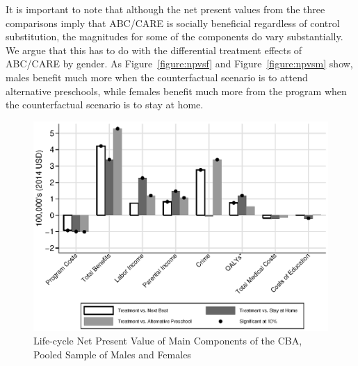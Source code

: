 It is important to note that although the net present values from the three comparisons imply that ABC/CARE is socially beneficial regardless of control substitution, the magnitudes for some of the components do vary substantially. We argue that this has to do with the differential treatment effects of ABC/CARE by gender. As Figure~\ref{figure:npvsf} and Figure~\ref{figure:npvsm} show, males benefit much more when the counterfactual scenario is to attend alternative preschools, while females benefit much more from the program when the counterfactual scenario is to stay at home.

\begin{figure}
\caption{Life-cycle Net Present Value of Main Components of the CBA, Pooled Sample of Males and Females}
\label{figure:npvs}
\centering
\includegraphics[width=.7\columnwidth]{output/abccare_npvs3.eps}
\floatfoot{
\footnotesize
}
\end{figure}
